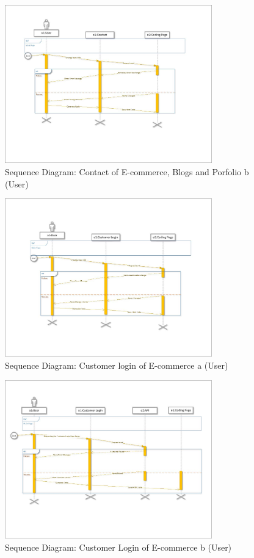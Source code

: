 \documentclass[12pt]{report}
\begin{document}
\begin{figure}[ht]
    \centering
    \includegraphics[width=0.8\textwidth]{Media/s1_Page_07.jpg} %
    \caption{Sequence Diagram: Contact of E-commerce, Blogs and Porfolio b (User)}
    \label{fig:drawing1}
\end{figure}

\begin{figure}[ht]
    \centering
    \includegraphics[width=0.8\textwidth]{Media/s1_Page_08.jpg} %
    \caption{Sequence Diagram: Customer login of E-commerce a (User)}
    \label{fig:drawing1}
\end{figure}

\begin{figure}[ht]
    \centering
    \includegraphics[width=0.8\textwidth]{Media/s1_Page_09.jpg} %
    \caption{Sequence Diagram: Customer Login of E-commerce b (User)}
    \label{fig:drawing1}
\end{figure}
\end{document}

